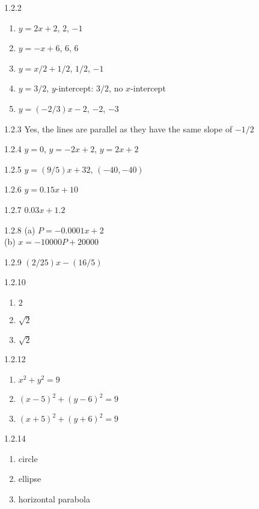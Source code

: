 \begin{Answer}{1.2.2}
\begin{enumerate}
	\item	$y=2x+2$, $2$, $-1$
	\item	$y=-x+6$, $6$, $6$
	\item	$y=x/2+1/2$, $1/2$, $-1$
	\item	$y=3/2$, $y$-intercept: $3/2$, no $x$-intercept
	\item	$y=(-2/3)x-2$, $-2$, $-3$
\end{enumerate}
\end{Answer}
\begin{Answer}{1.2.3}
Yes, the lines are parallel as they have the same slope of $-1/2$
\end{Answer}
\begin{Answer}{1.2.4}
$y=0$, $y=-2x+2$, $y=2x+2$
\end{Answer}
\begin{Answer}{1.2.5}
$y=(9/5)x+32$, $(-40,-40)$
\end{Answer}
\begin{Answer}{1.2.6}
$y=0.15x+10$
\end{Answer}
\begin{Answer}{1.2.7}
$0.03x+1.2$
\end{Answer}
\begin{Answer}{1.2.8}
(a) $P=-0.0001x+2$\\
(b) $x=-10000P+20000$
\end{Answer}
\begin{Answer}{1.2.9}
$(2/25)x-(16/5)$
\end{Answer}
\begin{Answer}{1.2.10}
\begin{enumerate}
	\item	$2$
	\item	$\sqrt{2}$
	\item	$\sqrt{2}$
\end{enumerate}
\end{Answer}
\begin{Answer}{1.2.12}
\begin{enumerate}
	\item	$x^2+y^2=9$
	\item	$(x-5)^2+(y-6)^2=9$
	\item	$(x+5)^2+(y+6)^2=9$
\end{enumerate}
\end{Answer}
\begin{Answer}{1.2.14}
\begin{enumerate}
	\item	circle
	\item	ellipse
	\item	horizontal parabola
\end{enumerate}
\end{Answer}
